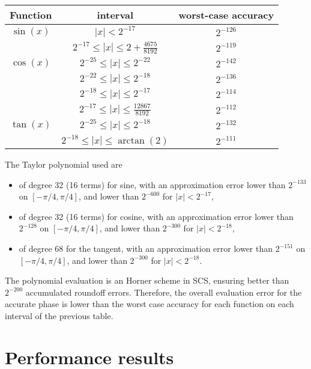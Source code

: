 \begin{center}
  \begin{tabular}{|c|c|c|}
    \hline
    Function & interval & worst-case accuracy \\
    \hline
    \hline
       $\sin(x)$ &  $|x|< 2^{-17}$                            & $2^{-126}$      \\
                 &  $ 2^{-17} \le |x| \le 2+\frac{4675}{8192}$& $2^{-119}$     \\
    \hline
       $\cos(x)$ &  $2^{-25} \le |x| \le 2^{-22}$            & $2^{-142}$       \\
                 &  $2^{-22} \le |x| \le 2^{-18}$            & $2^{-136}$       \\
                 &  $2^{-18} \le |x| \le 2^{-17}$            & $2^{-114}$       \\
                 &  $2^{-17} \le |x| \le \frac{12867}{8192}$ & $2^{-112}$       \\
    \hline
       $\tan(x)$ &  $2^{-25} \le |x| \le 2^{-18}$            & $2^{-132}$       \\
                 &  $2^{-18} \le |x| \le \arctan(2)$         & $2^{-111}$       \\
    \hline
  \end{tabular}
\end{center}

The Taylor polynomial used are
\begin{itemize}
\item of degree 32 (16 terms) for sine, with an approximation error
  lower than $2^{-133}$ on $[-\pi/4, \pi/4]$, and lower than
  $2^{-600}$ for $|x|< 2^{-17}$,

\item of degree 32 (16 terms) for cosine, with an approximation error
  lower than $2^{-128}$ on $[-\pi/4, \pi/4]$, and lower than
  $2^{-300}$ for $|x|< 2^{-18}$,

\item of degree 68 for the tangent, with an approximation error lower
  than $2^{-151}$ on $[-\pi/4, \pi/4]$, and lower than
  $2^{-300}$ for $|x|< 2^{-18}$.
\end{itemize}


The polynomial evaluation is an Horner scheme in SCS, ensuring better
than $2^{-200}$ accumulated roundoff errors. Therefore, the overall
evaluation error for the accurate phase is lower than the worst case accuracy for
each function on each interval of the previous table.


\section{Performance results}

